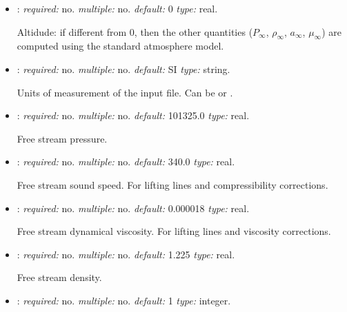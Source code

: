 \begin{itemize}
\begin{itemize}
    Unit vector that defines the direction of the velocity perturbation
    
    \item {}: \textit{required:} no. \textit{multiple:} yes. 
    \textit{type:} real.
    
    H: gust wave length. 
    
    \item {}: \textit{required:} no. \textit{multiple:} no. 
    \textit{default:} 0.0 \textit{type:} real.
    
    $\tau$: Time at which the gust starts. 
\end{itemize}

\item {}: \textit{required:} no. \textit{multiple:} no. 
\textit{default:} 0 \textit{type:} real.

Altidude: if different from 0, then the other quantities ($P_\infty$, $\rho_\infty$, $a_\infty$, $\mu_\infty$) 
are computed using the standard atmosphere model. 

\item {}: \textit{required:} no. \textit{multiple:} no. 
\textit{default:} SI \textit{type:} string.

Units of measurement of the input file. Can be  or . 


\item {}: \textit{required:} no. \textit{multiple:} no. 
\textit{default:} 101325.0 \textit{type:} real.

Free stream pressure.

\item {}: \textit{required:} no. \textit{multiple:} no. 
\textit{default:} 340.0 \textit{type:} real.

Free stream sound speed. For lifting lines and compressibility corrections.


\item {}: \textit{required:} no. \textit{multiple:} no. 
\textit{default:} 0.000018 \textit{type:} real.

Free stream dynamical viscosity. For lifting lines and viscosity corrections.

\item {}: \textit{required:} no. \textit{multiple:} no. 
\textit{default:} 1.225 \textit{type:} real.

Free stream density.

\item {}: \textit{required:} no. \textit{multiple:} no. 
\textit{default:} 1 \textit{type:} integer.


\end{itemize}

